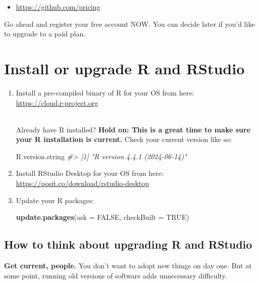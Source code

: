 \documentclass[
]{book}
\newenvironment{Shaded}{\begin{snugshade}}{\end{snugshade}}
\newcommand{\AttributeTok}[1]{\textcolor[rgb]{0.13,0.29,0.53}{#1}}
\newcommand{\CommentTok}[1]{\textcolor[rgb]{0.56,0.35,0.01}{\textit{#1}}}
\newcommand{\ConstantTok}[1]{\textcolor[rgb]{0.56,0.35,0.01}{#1}}
\newcommand{\FunctionTok}[1]{\textcolor[rgb]{0.13,0.29,0.53}{\textbf{#1}}}
\newcommand{\NormalTok}[1]{#1}
\providecommand{\tightlist}{%
  \setlength{\itemsep}{0pt}\setlength{\parskip}{0pt}}
\begin{document}
\begin{itemize}
\tightlist
\item
  \url{https://github.com/pricing}
\end{itemize}

Go ahead and register your free account NOW. You can decide later if you'd like to upgrade to a paid plan.

\chapter{Install or upgrade R and RStudio}\label{install-r-rstudio}

\begin{enumerate}
\def\labelenumi{\arabic{enumi}.}
\item
  Install a pre-compiled binary of R for your OS from here:\\
  \url{https://cloud.r-project.org}\strut \\
  Already have R installed? \textbf{Hold on: This is a great time to make sure your R installation is current.} Check your current version like so:

\begin{Shaded}
\begin{Highlighting}[]
\NormalTok{R.version.string}
\CommentTok{\#\textgreater{} [1] "R version 4.4.1 (2024{-}06{-}14)"}
\end{Highlighting}
\end{Shaded}
\item
  Install RStudio Desktop for your OS from here:
  \url{https://posit.co/download/rstudio-desktop}
\item
  Update your R packages:

\begin{Shaded}
\begin{Highlighting}[]
\FunctionTok{update.packages}\NormalTok{(}\AttributeTok{ask =} \ConstantTok{FALSE}\NormalTok{, }\AttributeTok{checkBuilt =} \ConstantTok{TRUE}\NormalTok{)}
\end{Highlighting}
\end{Shaded}
\end{enumerate}

\section{How to think about upgrading R and RStudio}\label{how-to-think-about-upgrading-r-and-rstudio}

\textbf{Get current, people.} You don't want to adopt new things on day one. But at some point, running old versions of software adds unnecessary difficulty.
\end{document}
